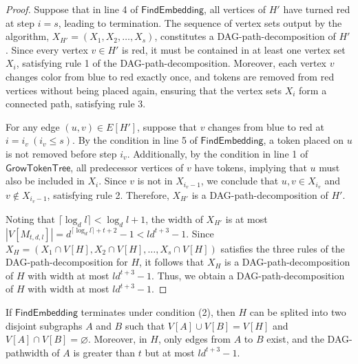 \documentclass[runningheads]{llncs}
\theoremstyle{plain}
\theoremstyle{definition}
\begin{document}
\begin{proof}
    Suppose that in line 4 of $\mathsf{FindEmbedding}$, all vertices of $H'$ have turned red at step $i=s$, leading to termination. The sequence of vertex sets output by the algorithm, $X_{H'} = (X_1, X_2, \dots , X_s)$, constitutes a DAG-path-decomposition of $H'$. Since every vertex $v \in H'$ is red, it must be contained in at least one vertex set $X_i$, satisfying rule 1 of the DAG-path-decomposition. Moreover, each vertex $v$ changes color from blue to red exactly once, and tokens are removed from red vertices without being placed again, ensuring that the vertex sets $X_i$ form a connected path, satisfying rule 3.

    For any edge $(u, v) \in E[H']$, suppose that $v$ changes from blue to red at $i=i_v~ (i_v \leq s)$. By the condition in line 5 of $\mathsf{FindEmbedding}$, a token placed on $u$ is not removed before step $i_v$. Additionally, by the condition in line 1 of $\mathsf{GrowTokenTree}$, all predecessor vertices of $v$ have tokens, implying that $u$ must also be included in $X_i$. Since $v$ is not in $X_{i_v-1}$, we conclude that $u, v \in X_{i_v}$ and $v \notin X_{i_v-1}$, satisfying rule 2. Therefore, $X_{H'}$ is a DAG-path-decomposition of $H'$.

    Noting that $\lceil \log_d l \rceil < \log_d l +1$, the width of $X_{H'}$ is at most $|V[M_{t, d, l}]| = d^{\lceil \log_d l \rceil +t+2}-1 < ld^{t+3}-1$. Since $X_H = (X_1 \cap V[H], X_2 \cap V[H], \dots , X_s \cap V[H])$ satisfies the three rules of the DAG-path-decomposition for $H$, it follows that $X_H$ is a DAG-path-decomposition of $H$ with width at most $ld^{t+3}-1$. Thus, we obtain a DAG-path-decomposition of $H$ with width at most $ld^{t+3}-1$.
\end{proof}

\begin{lemma}\label{lemma_(2)}
    If $\mathsf{FindEmbedding}$ terminates under condition (2), then $H$ can be splited into two disjoint subgraphs $A$ and $B$ such that $V[A] \cup V[B] = V[H]$ and $V[A] \cap V[B] = \varnothing$. Moreover, in $H$, only edges from $A$ to $B$ exist, and the DAG-pathwidth of $A$ is greater than $t$ but at most $ld^{t+3}-1$.
\end{lemma}
\end{document}
